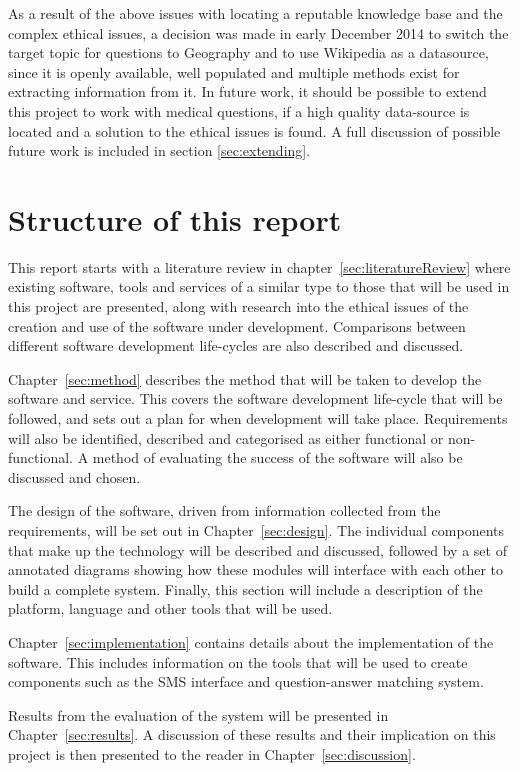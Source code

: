 \documentclass[authoryearcitations]{UoYCSproject}
\begin{document}
As a result of the above issues with locating a reputable knowledge base and the complex ethical issues, a decision was made in early December 2014 to switch the target topic for questions to Geography and to use Wikipedia as a datasource, since it is openly available, well populated and multiple methods exist for extracting information from it.  In future work, it should be possible to extend this project to work with medical questions, if a high quality data-source is located and a solution to the ethical issues is found. A full discussion of possible future work is included in section \ref{sec:extending}.

\section{Structure of this report}
This report starts with a literature review in chapter~\ref{sec:literatureReview} where existing software, tools and services of a similar type to those that will be used in this project are presented, along with research into the ethical issues of the creation and use of the software under development. Comparisons between different software development life-cycles are also described and discussed.

Chapter~\ref{sec:method} describes the method that will be taken to develop the software and service.  This covers the software development life-cycle that will be followed, and sets out a plan for when development will take place.  Requirements will also be identified, described and categorised  as either functional or non-functional.  A method of evaluating the success of the software will also be discussed and chosen.

The design of the software, driven from information collected from the requirements, will be set out in Chapter~\ref{sec:design}.  The individual components that make up the technology will be described and discussed, followed by a set of annotated diagrams showing how these modules will interface with each other to build a complete system.  Finally, this section will include a description of the platform, language and other tools that will be used.

Chapter~\ref{sec:implementation} contains details about the implementation of the software.  This includes information on the tools that will be used to create components such as the SMS interface and question-answer matching system.

Results from the evaluation of the system will be presented in Chapter~\ref{sec:results}.  A discussion of these results and their implication on this project is then presented to the reader in Chapter~\ref{sec:discussion}.
\end{document}
